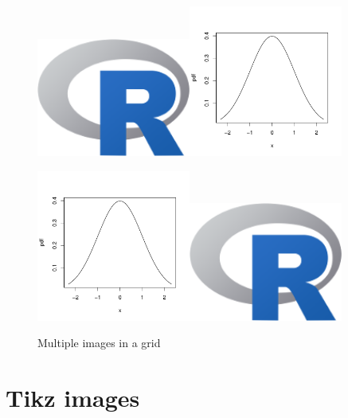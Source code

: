 \begin{figure}[htbp]
  \centering
  \includegraphics[width=0.45\textwidth]{Rlogo-5.png}\includegraphics[width=0.45\textwidth]{normal}
 

  \includegraphics[width=0.45\textwidth]{normal}\includegraphics[width=0.45\textwidth]{Rlogo-5.png}
  \caption{Multiple images in a grid}
  \label{fig:fourimages}
\end{figure}


\section{Tikz images}

